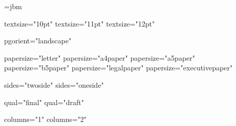 \def\addtocounter#1#2{%
    \expandafter\global\advance\csname c@#1\endcsname #2\relax
    \msihmode
    \msiopentag{texb}{<texb enc="1" name="addtocounter">}
       \msitag{<![CDATA[\addtocounter{#1}{#2}]]>}%
    \msiclosetag{texb}{</texb>}}


\msi@inline@proc={jbm}







\def\msi@stylesheets{\msitag{<?xml-stylesheet href="css/my.css" type="text/css"?>}\br}


\def\@brace#1{\char123\relax#1\char125\relax}

\def\br{\msitag{^^0a}}


\newif\ifmsi@firstopt
\msi@firstopttrue


\expandafter\def\csname 10ptAttrib\endcsname{textsize="10pt"}
\expandafter\def\csname 11ptAttrib\endcsname{textsize="11pt"}
\expandafter\def\csname 12ptAttrib\endcsname{textsize="12pt"}

\expandafter\def\csname landscapeAttrib\endcsname{pgorient="landscape"}

\expandafter\def\csname letterpaperAttrib\endcsname{papersize="letter"}
\expandafter\def\csname a4paperAttrib\endcsname{papersize="a4paper"}
\expandafter\def\csname a5paperAttrib\endcsname{papersize="a5paper"}
\expandafter\def\csname b5paperAttrib\endcsname{papersize="b5paper"}
\expandafter\def\csname legalpaperAttrib\endcsname{papersize="legalpaper"}
\expandafter\def\csname executivepaperAttrib\endcsname{papersize="executivepaper"}

\expandafter\def\csname twosideAttrib\endcsname{sides="twoside"}
\expandafter\def\csname onesideAttrib\endcsname{sides="oneside"}

\expandafter\def\csname finalAttrib\endcsname{qual="final"}
\expandafter\def\csname draftAttrib\endcsname{qual="draft"}

\expandafter\def\csname onecolumnAttrib\endcsname{columns="1"}
\expandafter\def\csname twocolumnAttrib\endcsname{columns="2"}

